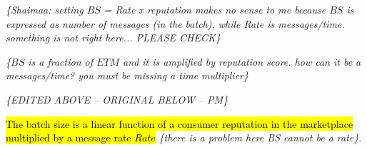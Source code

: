 \documentclass[letterpaper, 10 pt, conference]{ieeeconf}  %
\newcommand{\mycomment}[2]{\hl{#1} {{\leavevmode\smaller\color{red}\itshape\{#2\}}}}
\newcommand{\anote}[1]{{\leavevmode\smaller\itshape\color{red}\{#1\}}}
\newcommand{\bs}{\ensuremath{\mathit{BS}}}
\newcommand{\etm}{\ensuremath{\mathit{ETM}}}
\begin{document}
\anote{Shaimaa:  setting \bs{} = Rate x reputation makes no sense to me because \bs{} is expressed as number of messages (in the batch), while Rate is messages/time. 
	something is not right here...  PLEASE CHECK}

\anote{\bs{} is a fraction of \etm{} and it is amplified by reputation score. how can it be a messages/time?  you must be missing a time multiplier}



\anote{EDITED  ABOVE -- ORIGINAL BELOW -- PM}



%
%




\mycomment{The batch size is a linear function of a consumer reputation in the marketplace multiplied by a message rate $Rate$} {there is a problem here BS cannot be a rate}.
	
\end{document}
